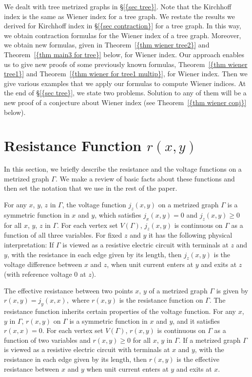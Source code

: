\documentclass[12pt]{amsart}
\theoremstyle{example}
\theoremstyle{definition}
\theoremstyle{notation}
\begin{document}
We dealt with tree metrized graphs in {\S\ref{{sec tree}}}. Note that the Kirchhoff index is the same as Wiener index for a tree graph. We restate the results we derived for Kirchhoff index in {\S\ref{{sec contraction}}} for a tree graph. In this way, we obtain contraction formulas for the Wiener index of a tree graph. Moreover, we obtain new formulas, given in {Theorem~\ref{{thm wiener tree2}}} and {Theorem~\ref{{thm main3 for tree}}} below, for Wiener index. Our approach enables us to give new proofs of some previously known formulas,  {Theorem~\ref{{thm wiener tree1}}} and {Theorem~\ref{{thm wiener for tree1 multip}}}, for Wiener index. Then we give various examples that we apply our formulas to compute Wiener indices.
At the end of {\S\ref{{sec tree}}}, we state two problems. Solution to any of them will be a new proof of a conjecture about Wiener index (see {Theorem~\ref{{thm wiener conj}}} below).

\section{Resistance Function $r(x,y)$}\label{sec resistance function}

In this section, we briefly describe the resistance and the voltage functions on a metrized graph ${\Gamma}$.
We make a review of basic facts about these functions and then set the notation that we use in the rest of the paper.

For any $x$, $y$, $z$ in ${\Gamma}$, the voltage function $j_z(x,y)$ on a metrized graph
${\Gamma}$ is a symmetric function in $x$ and $y$, which satisfies
$j_x(x,y)=0$ and $j_z(x,y) \geq 0$ for all $x$, $y$, $z$ in ${\Gamma}$.
For each vertex set ${V({\Gamma})}$, $j_{z}(x,y)$ is
continuous on ${\Gamma}$ as a function of all three variables.
For fixed $z$ and $y$ it
has the following physical interpretation: If $\Gamma$ is viewed
as a resistive electric circuit with terminals at $z$ and $y$,
with the resistance in each edge given by its length, then
$j_{z}(x,y)$ is the voltage difference between $x$ and $z$,
when unit current enters at $y$ and exits at $z$ (with reference
voltage $0$ at $z$).

The effective resistance between two points $x, \, y$ of a metrized graph ${\Gamma}$ is given by $r(x,y)=j_y(x,x),$
where $r(x,y)$ is the resistance function on ${\Gamma}$. The resistance function inherits certain properties of the voltage function.
For any $x$, $y$ in ${\Gamma}$,  $r(x,y)$ on
${\Gamma}$ is a symmetric function in $x$ and $y$, and it satisfies
$r(x,x)=0$. For each vertex set ${V({\Gamma})}$, $r(x,y)$ is
continuous on ${\Gamma}$ as a function of two variables and
$r(x,y) \geq 0$ for all $x$, $y$ in ${\Gamma}$.
If a metrized graph $\Gamma$ is viewed as a
resistive electric circuit with terminals at $x$ and $y$, with the
resistance in each edge given by its length, then $r(x,y)$ is
the effective resistance between $x$ and $y$ when unit current enters
at $y$ and exits at $x$.
\end{document}
